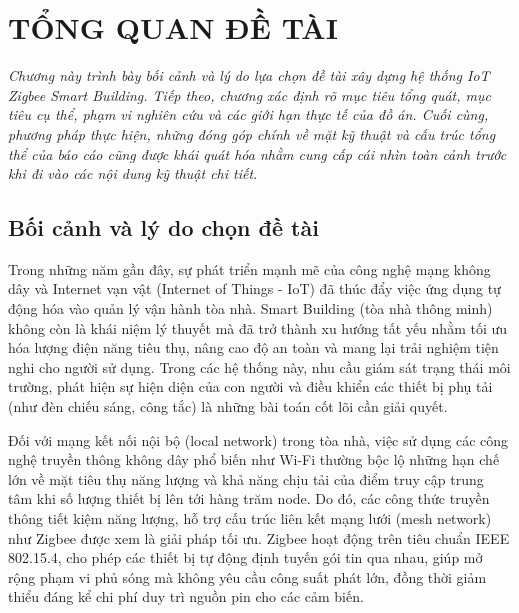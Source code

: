 \chapter{TỔNG QUAN ĐỀ TÀI}
\label{ch:tongquan-detai}

\vspace{0.5cm}
\noindent\textit{Chương này trình bày bối cảnh và lý do lựa chọn đề tài xây dựng hệ thống IoT Zigbee Smart Building. Tiếp theo, chương xác định rõ mục tiêu tổng quát, mục tiêu cụ thể, phạm vi nghiên cứu và các giới hạn thực tế của đồ án. Cuối cùng, phương pháp thực hiện, những đóng góp chính về mặt kỹ thuật và cấu trúc tổng thể của báo cáo cũng được khái quát hóa nhằm cung cấp cái nhìn toàn cảnh trước khi đi vào các nội dung kỹ thuật chi tiết.}
\vspace{0.5cm}

\section{Bối cảnh và lý do chọn đề tài}
\label{sec:ch1-boicanh}

Trong những năm gần đây, sự phát triển mạnh mẽ của công nghệ mạng không dây và Internet vạn vật (Internet of Things - IoT) đã thúc đẩy việc ứng dụng tự động hóa vào quản lý vận hành tòa nhà. Smart Building (tòa nhà thông minh) không còn là khái niệm lý thuyết mà đã trở thành xu hướng tất yếu nhằm tối ưu hóa lượng điện năng tiêu thụ, nâng cao độ an toàn và mang lại trải nghiệm tiện nghi cho người sử dụng. Trong các hệ thống này, nhu cầu giám sát trạng thái môi trường, phát hiện sự hiện diện của con người và điều khiển các thiết bị phụ tải (như đèn chiếu sáng, công tắc) là những bài toán cốt lõi cần giải quyết.

Đối với mạng kết nối nội bộ (local network) trong tòa nhà, việc sử dụng các công nghệ truyền thông không dây phổ biến như Wi-Fi thường bộc lộ những hạn chế lớn về mặt tiêu thụ năng lượng và khả năng chịu tải của điểm truy cập trung tâm khi số lượng thiết bị lên tới hàng trăm node. Do đó, các công thức truyền thông tiết kiệm năng lượng, hỗ trợ cấu trúc liên kết mạng lưới (mesh network) như Zigbee được xem là giải pháp tối ưu. Zigbee hoạt động trên tiêu chuẩn IEEE 802.15.4, cho phép các thiết bị tự động định tuyến gói tin qua nhau, giúp mở rộng phạm vi phủ sóng mà không yêu cầu công suất phát lớn, đồng thời giảm thiểu đáng kể chi phí duy trì nguồn pin cho các cảm biến.

